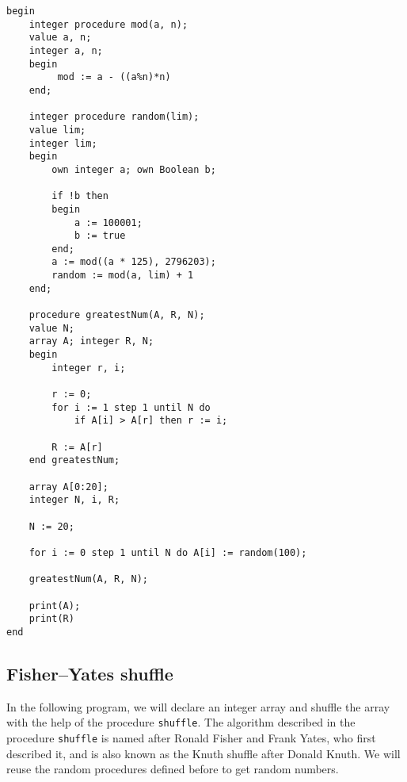 \documentclass{article}
\begin{document}
\begin{lstlisting}[language={[60]algol}]
begin
    integer procedure mod(a, n);
    value a, n;
    integer a, n;
    begin
         mod := a - ((a%n)*n)
    end;
 
    integer procedure random(lim);
    value lim;
    integer lim;
    begin
        own integer a; own Boolean b;
        
        if !b then
        begin
            a := 100001;
            b := true
        end;
        a := mod((a * 125), 2796203);
        random := mod(a, lim) + 1
    end;

    procedure greatestNum(A, R, N);
    value N;
    array A; integer R, N;
    begin
        integer r, i;
        
        r := 0;
        for i := 1 step 1 until N do
            if A[i] > A[r] then r := i;
        
        R := A[r]
    end greatestNum;
    
    array A[0:20];
    integer N, i, R;
    
    N := 20;
    
    for i := 0 step 1 until N do A[i] := random(100);
        
    greatestNum(A, R, N);
    
    print(A);
    print(R)
end
\end{lstlisting}

\subsection{Fisher–Yates shuffle}
In the following program, we will declare an integer array and shuffle the array with the help of the procedure \texttt{shuffle}. The algorithm described in the procedure \texttt{shuffle} is named after Ronald Fisher and Frank Yates, who first described it, and is also known as the Knuth shuffle after Donald Knuth. We will reuse the random procedures defined before to get random numbers.
\end{document}

